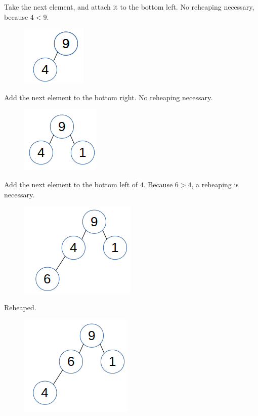 \documentclass{article}
\begin{document}
Take the next element, and attach it to the bottom left. No reheaping necessary, because $4<9$. 

\begin{figure}[H]
\includegraphics[scale=0.5]{./P16/1}
\centering
\end{figure}

Add the next element to the bottom right. No reheaping necessary. 

\begin{figure}[H]
\includegraphics[scale=0.5]{./P16/2}
\centering
\end{figure}


Add the next element to the bottom left of $4$. Because $6>4$, a reheaping is necessary. 

\begin{figure}[H]
\includegraphics[scale=0.5]{./P16/3}
\centering
\end{figure}


Reheaped. 

\begin{figure}[H]
\includegraphics[scale=0.5]{./P16/4}
\centering
\end{figure}
\end{document}
